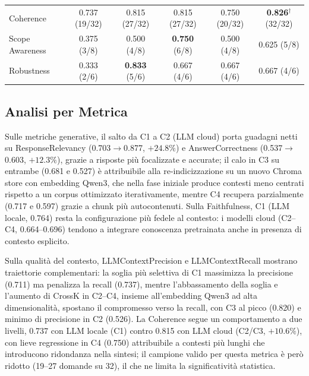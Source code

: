 \documentclass[11pt,a4paper]{article}
\begin{document}
\begin{table}[H]
\begin{tabular}{@{}lccccc@{}}
Coherence           & 0.737 \scriptsize(19/32) & 0.815 \scriptsize(27/32)
                    & 0.815 \scriptsize(27/32) & 0.750 \scriptsize(20/32)
                    & \textbf{0.826}$^\dagger$ \scriptsize(32/32) \\
\rowcolor{blue!4}
Scope Awareness     & 0.375 \scriptsize(3/8)  & 0.500 \scriptsize(4/8)
                    & \textbf{0.750} \scriptsize(6/8)  & 0.500 \scriptsize(4/8)
                    & 0.625 \scriptsize(5/8) \\
Robustness          & 0.333 \scriptsize(2/6)  & \textbf{0.833} \scriptsize(5/6)
                    & 0.667 \scriptsize(4/6)  & 0.667 \scriptsize(4/6)
                    & 0.667 \scriptsize(4/6) \\
\bottomrule
\end{tabular}
\end{table}

\subsection{Analisi per Metrica}
\label{subsec:per_metric}

Sulle metriche generative, il salto da C1 a C2 (LLM cloud) porta guadagni netti su
ResponseRelevancy (0.703$\to$0.877, $+24.8\%$) e AnswerCorrectness (0.537$\to$0.603,
$+12.3\%$), grazie a risposte più focalizzate e accurate; il calo in C3 su entrambe
(0.681 e 0.527) è attribuibile alla re-indicizzazione su un nuovo Chroma store con
embedding Qwen3, che nella fase iniziale produce contesti meno centrati rispetto a un
corpus ottimizzato iterativamente, mentre C4 recupera parzialmente (0.717 e 0.597)
grazie a chunk più autocontenuti. Sulla Faithfulness, C1 (LLM locale, 0.764) resta la
configurazione più fedele al contesto: i modelli cloud (C2--C4, 0.664--0.696) tendono a
integrare conoscenza pretrainata anche in presenza di contesto esplicito.

Sulla qualità del contesto, LLMContextPrecision e LLMContextRecall mostrano traiettorie
complementari: la soglia più selettiva di C1 massimizza la precisione (0.711) ma
penalizza la recall (0.737), mentre l'abbassamento della soglia e l'aumento di CrossK in
C2--C4, insieme all'embedding Qwen3 ad alta dimensionalità, spostano il compromesso verso
la recall, con C3 al picco (0.820) e minimo di precisione in C2 (0.526). La Coherence
segue un comportamento a due livelli, 0.737 con LLM locale (C1) contro 0.815 con LLM
cloud (C2/C3, $+10.6\%$), con lieve regressione in C4 (0.750) attribuibile a contesti più
lunghi che introducono ridondanza nella sintesi; il campione valido per questa metrica è
però ridotto (19--27 domande su 32), il che ne limita la significatività statistica.
\end{document}
